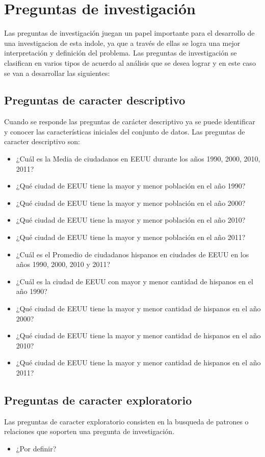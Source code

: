 

\section{Preguntas de investigación}
Las preguntas de investigación juegan un papel importante para el desarrollo de una investigacion de esta indole, ya que a través de ellas se logra una mejor interpretación  y definición del problema.  Las preguntas de investigación se clasifican en varios tipos de acuerdo al análisis que se desea lograr y en este caso se van a desarrollar las siguientes:
 \subsection{Preguntas de caracter descriptivo}
 Cuando se responde las preguntas de carácter descriptivo ya se puede identificar y conocer las características iniciales del conjunto de datos. Las preguntas de caracter descriptivo son:
  \begin{itemize}
  \item ¿Cuál es la Media de ciudadanos en EEUU durante los años  1990, 2000, 2010, 2011?
  \item ¿Qué ciudad de EEUU tiene la mayor y menor población en el año 1990?
  \item ¿Qué ciudad de EEUU tiene la mayor y menor población en el año 2000?
  \item ¿Qué ciudad de EEUU tiene la mayor y menor población en el año 2010?
  \item ¿Qué ciudad de EEUU tiene la mayor y menor población en el año 2011? 
   \item ¿Cuál es el Promedio de ciudadanos hispanos en ciudades de EEUU en los años 1990, 2000, 2010 y 2011?
   \item ¿Cuál es la ciudad de EEUU con mayor y menor cantidad de hispanos en el año 1990?
   \item ¿Qué ciudad de EEUU tiene la mayor y menor cantidad de hispanos en el año 2000?
   \item ¿Qué ciudad de EEUU tiene la mayor y menor cantidad de hispanos en el año 2010?
   \item ¿Qué ciudad de EEUU tiene la mayor y menor cantidad de hispanos en el año 2011?
  

  \end{itemize}
  \subsection{Preguntas de caracter exploratorio}
   Las preguntas de caracter exploratorio consisten en la busqueda de patrones o relaciones que soporten una pregunta de investigación.
  \begin{itemize}
   \item ¿Por definir?

  \end{itemize}

